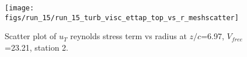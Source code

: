 \begin{figure}[H]
\centering
\texttt{[image: figs/run\_15/run\_15\_turb\_visc\_ettap\_top\_vs\_r\_meshscatter]}
\caption{Scatter plot of $
u_T$ reynolds stress term vs radius at $z/c$=6.97, $V_{free}$=23.21, station 2.}
\label{fig:run_15_turb_visc_ettap_top_vs_r_meshscatter}
\end{figure}


